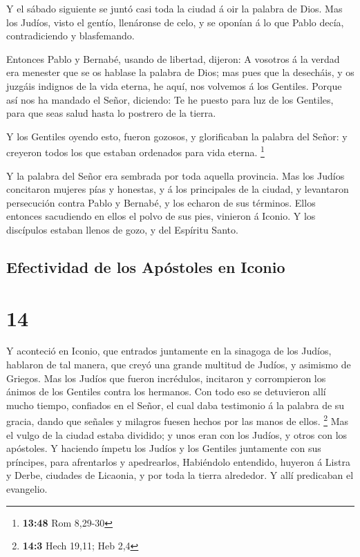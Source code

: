  Y el sábado siguiente se juntó casi toda la ciudad á oir
la palabra de Dios.  Mas los Judíos, visto el gentío,
llenáronse de celo, y se oponían á lo que Pablo decía, contradiciendo y
blasfemando.

 Entonces Pablo y Bernabé, usando de libertad, dijeron: A
vosotros á la verdad era menester que se os hablase la palabra de Dios;
mas pues que la desecháis, y os juzgáis indignos de la vida eterna, he
aquí, nos volvemos á los Gentiles.  Porque así nos ha
mandado el Señor, diciendo: Te he puesto para luz de los Gentiles, para
que seas salud hasta lo postrero de la tierra.

 Y los Gentiles oyendo esto, fueron gozosos, y glorificaban
la palabra del Señor: y creyeron todos los que estaban ordenados para
vida eterna. \footnote{\textbf{13:48} Rom 8,29-30}

 Y la palabra del Señor era sembrada por toda aquella
provincia.  Mas los Judíos concitaron mujeres pías y
honestas, y á los principales de la ciudad, y levantaron persecución
contra Pablo y Bernabé, y los echaron de sus términos. 
Ellos entonces sacudiendo en ellos el polvo de sus pies, vinieron á
Iconio.  Y los discípulos estaban llenos de gozo, y del
Espíritu Santo.

\hypertarget{efectividad-de-los-apuxf3stoles-en-iconio}{%
\subsection{Efectividad de los Apóstoles en
Iconio}\label{efectividad-de-los-apuxf3stoles-en-iconio}}

\hypertarget{section-13}{%
\section{14}\label{section-13}}

 Y aconteció en Iconio, que entrados juntamente en la
sinagoga de los Judíos, hablaron de tal manera, que creyó una grande
multitud de Judíos, y asimismo de Griegos.  Mas los Judíos
que fueron incrédulos, incitaron y corrompieron los ánimos de los
Gentiles contra los hermanos.  Con todo eso se detuvieron
allí mucho tiempo, confiados en el Señor, el cual daba testimonio á la
palabra de su gracia, dando que señales y milagros fuesen hechos por las
manos de ellos. \footnote{\textbf{14:3} Hech 19,11; Heb 2,4}
 Mas el vulgo de la ciudad estaba dividido; y unos eran con
los Judíos, y otros con los apóstoles.  Y haciendo ímpetu
los Judíos y los Gentiles juntamente con sus príncipes, para afrentarlos
y apedrearlos,  Habiéndolo entendido, huyeron á Listra y
Derbe, ciudades de Licaonia, y por toda la tierra alrededor.
 Y allí predicaban el evangelio.

